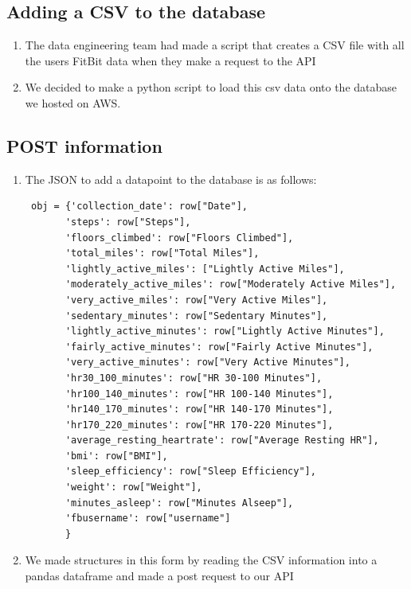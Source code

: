 \documentclass[]{book}
\providecommand{\tightlist}{%
  \setlength{\itemsep}{0pt}\setlength{\parskip}{0pt}}
\begin{document}
\subsection{Adding a CSV to the
database}\label{adding-a-csv-to-the-database}

\begin{enumerate}
\def\labelenumi{\arabic{enumi}.}
\tightlist
\item
  The data engineering team had made a script that creates a CSV file
  with all the users FitBit data when they make a request to the API
\item
  We decided to make a python script to load this csv data onto the
  database we hosted on AWS.
\end{enumerate}

\subsection{POST information}\label{post-information}

\begin{enumerate}
\def\labelenumi{\arabic{enumi}.}
\item
  The JSON to add a datapoint to the database is as follows:

\begin{verbatim}
 obj = {'collection_date': row["Date"],
       'steps': row["Steps"],
       'floors_climbed': row["Floors Climbed"],
       'total_miles': row["Total Miles"],
       'lightly_active_miles': ["Lightly Active Miles"],
       'moderately_active_miles': row["Moderately Active Miles"],
       'very_active_miles': row["Very Active Miles"],
       'sedentary_minutes': row["Sedentary Minutes"],
       'lightly_active_minutes': row["Lightly Active Minutes"],
       'fairly_active_minutes': row["Fairly Active Minutes"],
       'very_active_minutes': row["Very Active Minutes"],
       'hr30_100_minutes': row["HR 30-100 Minutes"],
       'hr100_140_minutes': row["HR 100-140 Minutes"],
       'hr140_170_minutes': row["HR 140-170 Minutes"],
       'hr170_220_minutes': row["HR 170-220 Minutes"],
       'average_resting_heartrate': row["Average Resting HR"],
       'bmi': row["BMI"],
       'sleep_efficiency': row["Sleep Efficiency"],
       'weight': row["Weight"],
       'minutes_asleep': row["Minutes Alseep"],
       'fbusername': row["username"]
       }
\end{verbatim}
\item
  We made structures in this form by reading the CSV information into a
  pandas dataframe and made a post request to our API
\end{enumerate}
\end{document}
